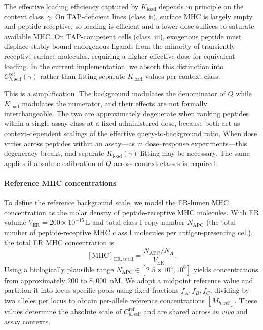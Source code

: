 \documentclass[11pt]{article}
\begin{document}
The effective loading efficiency captured by \(K_{\mathrm{load}}\) depends in principle on the context class~\(\gamma\). On TAP-deficient lines (class~ii), surface MHC is largely empty and peptide-receptive, so loading is efficient and a lower dose suffices to saturate available MHC. On TAP-competent cells (class~iii), exogenous peptide must displace stably bound endogenous ligands from the minority of transiently receptive surface molecules, requiring a higher effective dose for equivalent loading. In the current implementation, we absorb this distinction into \(C^{\mathrm{ref}}_{h,\mathrm{self}}(\gamma)\) rather than fitting separate \(K_{\mathrm{load}}\) values per context class.

This is a simplification. The background modulates the denominator of \(Q\) while \(K_{\mathrm{load}}\) modulates the numerator, and their effects are not formally interchangeable. The two are approximately degenerate when ranking peptides within a single assay class at a fixed administered dose, because both act as context-dependent scalings of the effective query-to-background ratio. When dose varies across peptides within an assay---as in dose--response experiments---this degeneracy breaks, and separate \(K_{\mathrm{load}}(\gamma)\) fitting may be necessary. The same applies if absolute calibration of \(Q\) across context classes is required.

\paragraph{Reference MHC concentrations}
To define the reference background scale, we model the ER-lumen MHC concentration as the molar density of peptide-receptive MHC molecules. With ER volume \(V_{\mathrm{ER}}=200\times10^{-15}\,\mathrm{L}\) and total class I copy number \(N_{\mathrm{APC}}\) (the total number of peptide-receptive MHC class I molecules per antigen-presenting cell), the total ER MHC concentration is
\[
[\mathrm{MHC}]_{\mathrm{ER,total}}
=
\frac{N_{\mathrm{APC}}/N_A}{V_{\mathrm{ER}}}.
\]
Using a biologically plausible range \(N_{\mathrm{APC}}\in[2.5\times10^4,10^6]\) yields concentrations from approximately \(200\) to \(8{,}000\)~nM. We adopt a midpoint reference value and partition it into locus-specific pools using fixed fractions \(f_A,f_B,f_C\), dividing by two alleles per locus to obtain per-allele reference concentrations \([M_{h,\mathrm{ref}}]\). These values determine the absolute scale of \(C^{\mathrm{ref}}_{h,\mathrm{self}}\) and are shared across \textit{in vivo} and assay contexts.
\end{document}
